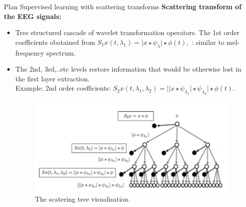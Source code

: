 \documentclass{beamer}
\begin{document}
\begin{frame}{ Plan }{ Supervised learning with scattering transforms}
 \textbf{Scattering transform of the EEG signals:}  
  \begin{itemize}
   \item { Tree structured cascade of wavelet transformation operators.  The 1st order coefficients obatained from $S_1x(t,\lambda_1)=\vert x\star\psi_{\lambda}\vert \star \phi(t),$ : similar to mel-frequency spectrum. 
   }
   \item {The 2nd, 3rd,..etc levels restore information that would be otherwise lost in the first layer extraction.\\
   Example: 2nd order coefficients: $S_2x(t,\lambda_1,\lambda_2)=\vert\vert x\star \psi_{\lambda_1} \vert \star \psi_{\lambda_2}\vert \star \phi(t)$.  
   	\begin{figure}
   		\centering
   		\includegraphics[scale=0.4]{figures/scat}
   		\caption{\label{fig:scat} The scatering tree visualisation.}
   	\end{figure}
   
   }
   \end{itemize}
\end{frame}
\end{document}
